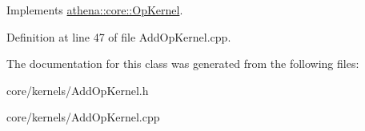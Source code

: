 Implements \mbox{\hyperlink{classathena_1_1core_1_1_op_kernel_a762e541463ffd089b47a8e6755c30fe1}{athena\+::core\+::\+Op\+Kernel}}.



Definition at line 47 of file Add\+Op\+Kernel.\+cpp.



The documentation for this class was generated from the following files\+:\begin{DoxyCompactItemize}
\item 
core/kernels/Add\+Op\+Kernel.\+h\item 
core/kernels/Add\+Op\+Kernel.\+cpp\end{DoxyCompactItemize}
